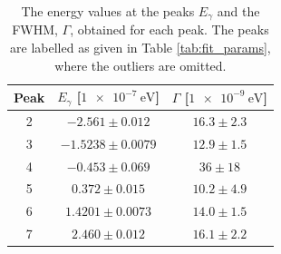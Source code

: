 \documentclass[a4paper]{report}
\numberwithin{equation}{section}
\begin{document}

\begin{table}[!ht]
    \centering
    \begin{tabular}{|c|c|c|}
    \hline  
        Peak & $E_\gamma$ [$\SI{1e-7}{\electronvolt}$] & $\Gamma$ [$\SI{1e-9}{\electronvolt}$] \\ \hline
        2 &$-2.561 \pm 0.012$ &   $16.3 \pm 2.3$ \\ \hline
        3 &$-1.5238 \pm 0.0079$ & $12.9 \pm 1.5$ \\ \hline
        4 &$-0.453 \pm 0.069$ &   $36 \pm 18 $ \\ \hline
        5 &$ 0.372 \pm 0.015$ &   $10.2 \pm 4.9$ \\ \hline
        6 &$ 1.4201 \pm 0.0073$ & $14.0 \pm 1.5$ \\ \hline
        7 &$ 2.460 \pm 0.012$ &   $16.1 \pm 2.2$ \\ \hline
    \end{tabular}
    \caption{The energy values at the peaks $E_\gamma$ and the FWHM, $\Gamma$, obtained for each peak. The peaks are 
    labelled as given in Table \ref{tab:fit_params}, where the outliers are omitted.}
\label{tab:energy_params}
\end{table}
\end{document}
